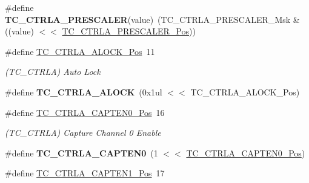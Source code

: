 \begin{DoxyCompactItemize}
\item 
\hypertarget{group___s_a_m_l21___t_c_gaa64e1b172a98651b7a198c8ab5be6fcd}{}\#define {\bfseries T\+C\+\_\+\+C\+T\+R\+L\+A\+\_\+\+P\+R\+E\+S\+C\+A\+L\+E\+R}(value)~(T\+C\+\_\+\+C\+T\+R\+L\+A\+\_\+\+P\+R\+E\+S\+C\+A\+L\+E\+R\+\_\+\+Msk \& ((value) $<$$<$ \hyperlink{group___s_a_m_l21___t_c_ga99d3a0239aaa0aecd6d8bec41fd4ce05}{T\+C\+\_\+\+C\+T\+R\+L\+A\+\_\+\+P\+R\+E\+S\+C\+A\+L\+E\+R\+\_\+\+Pos}))\label{group___s_a_m_l21___t_c_gaa64e1b172a98651b7a198c8ab5be6fcd}

\item 
\hypertarget{group___s_a_m_l21___t_c_ga79eb3f92a469f2e41ea3faadf029b466}{}\#define \hyperlink{group___s_a_m_l21___t_c_ga79eb3f92a469f2e41ea3faadf029b466}{T\+C\+\_\+\+C\+T\+R\+L\+A\+\_\+\+A\+L\+O\+C\+K\+\_\+\+Pos}~11\label{group___s_a_m_l21___t_c_ga79eb3f92a469f2e41ea3faadf029b466}

\begin{DoxyCompactList}\small\item\em (T\+C\+\_\+\+C\+T\+R\+L\+A) Auto Lock \end{DoxyCompactList}\item 
\hypertarget{group___s_a_m_l21___t_c_gabf0104cbaadae4c50256938a70b64c51}{}\#define {\bfseries T\+C\+\_\+\+C\+T\+R\+L\+A\+\_\+\+A\+L\+O\+C\+K}~(0x1ul $<$$<$ T\+C\+\_\+\+C\+T\+R\+L\+A\+\_\+\+A\+L\+O\+C\+K\+\_\+\+Pos)\label{group___s_a_m_l21___t_c_gabf0104cbaadae4c50256938a70b64c51}

\item 
\hypertarget{group___s_a_m_l21___t_c_gad6a508b58ed9d3ad06e17b6fb3aa3bab}{}\#define \hyperlink{group___s_a_m_l21___t_c_gad6a508b58ed9d3ad06e17b6fb3aa3bab}{T\+C\+\_\+\+C\+T\+R\+L\+A\+\_\+\+C\+A\+P\+T\+E\+N0\+\_\+\+Pos}~16\label{group___s_a_m_l21___t_c_gad6a508b58ed9d3ad06e17b6fb3aa3bab}

\begin{DoxyCompactList}\small\item\em (T\+C\+\_\+\+C\+T\+R\+L\+A) Capture Channel 0 Enable \end{DoxyCompactList}\item 
\hypertarget{group___s_a_m_l21___t_c_gac1ca96adcce5fc553183830727d583f1}{}\#define {\bfseries T\+C\+\_\+\+C\+T\+R\+L\+A\+\_\+\+C\+A\+P\+T\+E\+N0}~(1 $<$$<$ \hyperlink{group___s_a_m_l21___t_c_gad6a508b58ed9d3ad06e17b6fb3aa3bab}{T\+C\+\_\+\+C\+T\+R\+L\+A\+\_\+\+C\+A\+P\+T\+E\+N0\+\_\+\+Pos})\label{group___s_a_m_l21___t_c_gac1ca96adcce5fc553183830727d583f1}

\item 
\hypertarget{group___s_a_m_l21___t_c_ga88b8bd9d9ce085cbf8aa64d5e34d5c05}{}\#define \hyperlink{group___s_a_m_l21___t_c_ga88b8bd9d9ce085cbf8aa64d5e34d5c05}{T\+C\+\_\+\+C\+T\+R\+L\+A\+\_\+\+C\+A\+P\+T\+E\+N1\+\_\+\+Pos}~17\label{group___s_a_m_l21___t_c_ga88b8bd9d9ce085cbf8aa64d5e34d5c05}


\end{DoxyCompactItemize}
